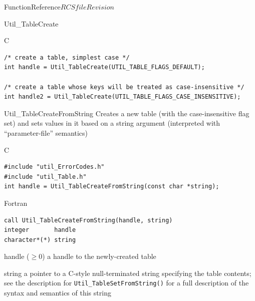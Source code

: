 \begin{cactuspart}{FunctionReference}{$RCSfile$}{$Revision$}
\begin{FunctionDescription}{Util\_TableCreate}
\begin{ExampleSection}
\begin{Example}{C}
\begin{verbatim}
/* create a table, simplest case */
int handle = Util_TableCreate(UTIL_TABLE_FLAGS_DEFAULT);

/* create a table whose keys will be treated as case-insensitive */
int handle2 = Util_TableCreate(UTIL_TABLE_FLAGS_CASE_INSENSITIVE);
\end{verbatim}
\end{Example}
\end{ExampleSection}
\end{FunctionDescription}


\begin{FunctionDescription}{Util\_TableCreateFromString}
\label{Util-TableCreateFromString}
Creates a new table (with the case-insensitive flag set) and sets
values in it based on a string argument (interpreted with
``parameter-file'' semantics)

\begin{SynopsisSection}
\begin{Synopsis}{C}
\begin{verbatim}
#include "util_ErrorCodes.h"
#include "util_Table.h"
int handle = Util_TableCreateFromString(const char *string);
\end{verbatim}
\end{Synopsis}
\begin{Synopsis}{Fortran}
\begin{verbatim}
call Util_TableCreateFromString(handle, string)
integer       handle
character*(*) string
\end{verbatim}
\end{Synopsis}
\end{SynopsisSection}

\begin{ResultSection}
\begin{Result}{handle ($\ge 0$)}
a handle to the newly-created table
\end{Result}
\end{ResultSection}

\begin{ParameterSection}
\begin{Parameter}{string}
a pointer to a C-style null-terminated string specifying the table
contents; see the description for \verb|Util_TableSetFromString()|
for a full description of the syntax and semantics of this string
\end{Parameter}
\end{ParameterSection}


\end{FunctionDescription}
\end{cactuspart}
